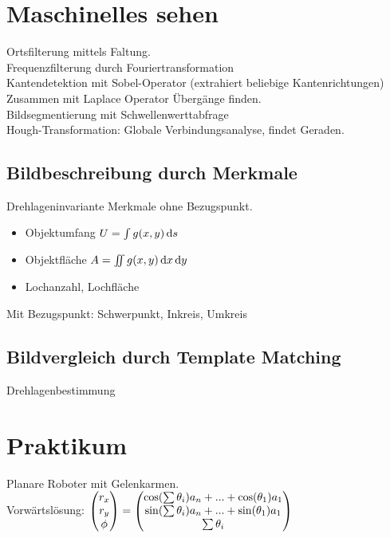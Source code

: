 \documentclass[6pt,a4paper]{scrartcl}
\begin{document}
\begin{multicols}{4}
\section{Maschinelles sehen}
Ortsfilterung mittels Faltung.\\
Frequenzfilterung durch Fouriertransformation\\
Kantendetektion mit Sobel-Operator (extrahiert beliebige Kantenrichtungen)\\
Zusammen mit Laplace Operator Übergänge finden.\\
Bildsegmentierung mit Schwellenwerttabfrage\\
Hough-Transformation: Globale Verbindungsanalyse, findet Geraden.\\

	\subsection{Bildbeschreibung durch Merkmale}
	Drehlageninvariante Merkmale ohne Bezugspunkt.\\
	\begin{itemize}
		\item Objektumfang $U = \int g(x,y) \diff s$
		\item Objektfläche $A = \iint g(x,y) \diff x \diff y$
		\item Lochanzahl, Lochfläche
	\end{itemize}
	
		Mit Bezugspunkt: Schwerpunkt, Inkreis, Umkreis

	\subsection{Bildvergleich durch Template Matching}
	
	Drehlagenbestimmung\\


\section{Praktikum}
Planare Roboter mit Gelenkarmen.\\
Vorwärtslösung: $\begin{pmatrix} r_x \\ r_y \\ \phi  \end{pmatrix} = \begin{pmatrix} \cos(\sum \theta_i)a_n + ... + \cos(\theta_1)a_1 \\ \sin(\sum \theta_i)a_n + ... + \sin(\theta_1)a_1 \\ \sum \theta_i  \end{pmatrix}$\\


\end{multicols}

\end{document}
